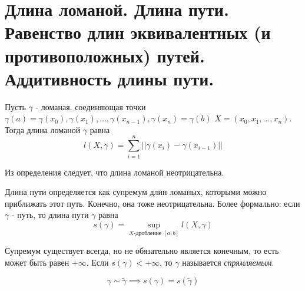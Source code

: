 \documentclass[../main.tex]{subfiles}
\begin{document}
\newpage
\hypertarget{q13}{\section{Длина ломаной. Длина пути. Равенство длин эквивалентных (и противоположных) путей. Аддитивность длины пути.}}
Пусть \( \gamma \) - ломаная, соединяющая точки \( \gamma \left( a\right)= \gamma \left( x_0\right), \gamma \left( x_1\right), \dots,  \gamma \left( x_{n-1}\right), \gamma \left( x_n\right)= \gamma \left( b\right)\)
\(  X=\left( x_0,x_1, \dots,x_n\right)\). Тогда длина ломаной \( \gamma \) равна 
\[ l \left(X, \gamma \right) = \sum\limits_{ i=1}^{ n} \left| \left| \gamma \left( x_i\right)- \gamma \left( x_{i-1}\right)\right|\right|\] 

Из определения следует, что длина ломаной неотрицательна. 


Длина пути определяется как супремум длин ломаных, которыми можно приближать этот путь. Конечно, она тоже неотрицательна. Более формально: если \( \gamma \) - путь, то длина пути \( \gamma \) равна 
\[ s\left(\gamma \right)= \sup\limits_{ X\text{-дробление }\left[ a,b\right]} l \left( X, \gamma \right)\]

Супремум существует всегда, но не обязательно является конечным, то есть может быть равен \( + \infty \). Если \( s\left( \gamma \right)<+ \infty \), то \( \gamma \) называется \emph{спрямляемым}.  

\begin{thm}
    \[ \gamma \sim \tilde{ \gamma } \implies s\left( \gamma \right)=s\left( \tilde{ \gamma }\right)\]
\end{thm}
\end{document}
